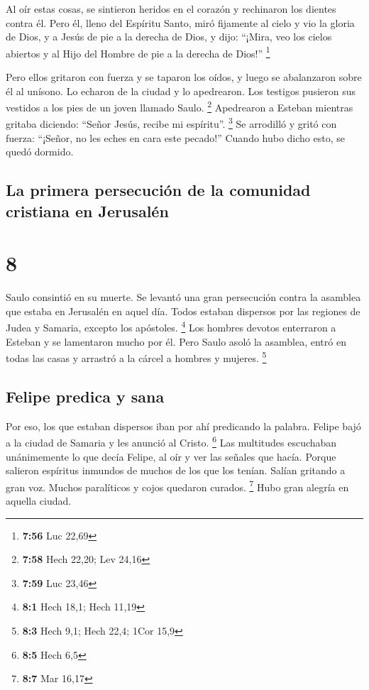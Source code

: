  Al oír estas cosas, se sintieron heridos en el corazón y
rechinaron los dientes contra él.  Pero él, lleno del
Espíritu Santo, miró fijamente al cielo y vio la gloria de Dios, y a
Jesús de pie a la derecha de Dios,  y dijo: ``¡Mira, veo
los cielos abiertos y al Hijo del Hombre de pie a la derecha de Dios!''
\footnote{\textbf{7:56} Luc 22,69}

 Pero ellos gritaron con fuerza y se taparon los oídos, y
luego se abalanzaron sobre él al unísono.  Lo echaron de
la ciudad y lo apedrearon. Los testigos pusieron sus vestidos a los pies
de un joven llamado Saulo. \footnote{\textbf{7:58} Hech 22,20; Lev 24,16}
 Apedrearon a Esteban mientras gritaba diciendo: ``Señor
Jesús, recibe mi espíritu''. \footnote{\textbf{7:59} Luc 23,46}
 Se arrodilló y gritó con fuerza: ``¡Señor, no les eches
en cara este pecado!'' Cuando hubo dicho esto, se quedó dormido.

\hypertarget{la-primera-persecuciuxf3n-de-la-comunidad-cristiana-en-jerusaluxe9n}{%
\subsection{La primera persecución de la comunidad cristiana en
Jerusalén}\label{la-primera-persecuciuxf3n-de-la-comunidad-cristiana-en-jerusaluxe9n}}

\hypertarget{section-7}{%
\section{8}\label{section-7}}

 Saulo consintió en su muerte. Se levantó una gran
persecución contra la asamblea que estaba en Jerusalén en aquel día.
Todos estaban dispersos por las regiones de Judea y Samaria, excepto los
apóstoles. \footnote{\textbf{8:1} Hech 18,1; Hech 11,19} 
Los hombres devotos enterraron a Esteban y se lamentaron mucho por él.
 Pero Saulo asoló la asamblea, entró en todas las casas y
arrastró a la cárcel a hombres y mujeres. \footnote{\textbf{8:3} Hech
  9,1; Hech 22,4; 1Cor 15,9}

\hypertarget{felipe-predica-y-sana}{%
\subsection{Felipe predica y sana}\label{felipe-predica-y-sana}}

 Por eso, los que estaban dispersos iban por ahí
predicando la palabra.  Felipe bajó a la ciudad de Samaria
y les anunció al Cristo. \footnote{\textbf{8:5} Hech 6,5} 
Las multitudes escuchaban unánimemente lo que decía Felipe, al oír y ver
las señales que hacía.  Porque salieron espíritus inmundos
de muchos de los que los tenían. Salían gritando a gran voz. Muchos
paralíticos y cojos quedaron curados. \footnote{\textbf{8:7} Mar 16,17}
 Hubo gran alegría en aquella ciudad.

